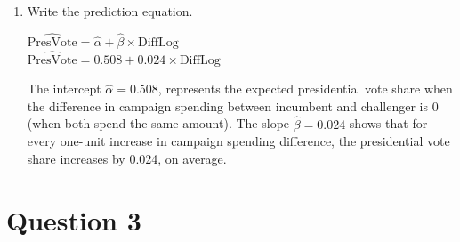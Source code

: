 \documentclass[12pt,letterpaper]{article}
\begin{document}
\begin{enumerate}
		\vspace{.5cm}
		\item Write the prediction equation.
		\begin{center}
		$\widehat{\text {PresVote}} = \hat{\alpha} + \hat{\beta} \times \text{DiffLog}$ \\ [0.2cm]
		$\widehat{\text {PresVote}} = 0.508 + 0.024 \times \text{DiffLog}$
		\end{center}
		The intercept $\hat{\alpha} = 0.508$, represents the expected presidential vote share when the difference in campaign spending between incumbent and challenger is 0 (when both spend the same amount). The slope $\hat{\beta} = 0.024$ shows that for every one-unit increase in campaign spending difference, the presidential vote share increases by 0.024, on average. 
	\end{enumerate}
	
\vspace{1.5cm}
\section*{Question 3}
\end{document}
